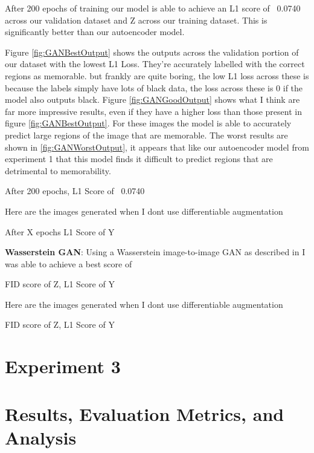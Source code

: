 \documentclass{UoYCSproject}
\begin{document}

After 200 epochs of training our model is able to achieve an L1 score of ~0.0740 across our validation dataset and Z across our training dataset.
This is significantly better than our autoencoder model. 

Figure \ref{fig:GANBestOutput} shows the outputs across the validation portion of our dataset with the lowest L1 Loss. They're accurately labelled with the correct regions as memorable. 
but frankly are quite boring, the low L1 loss across these is because the labels simply have lots of black data, the loss across these is 0 if the model also outputs black. 
Figure \ref{fig:GANGoodOutput} shows what I think are far more impressive results, even if they have a higher loss than those present in figure \ref{fig:GANBestOutput}. For these images the model is able to accurately predict large regions of the image that are memorable.
The worst results are shown in \ref{fig:GANWorstOutput}, it appears that like our autoencoder model from experiment 1 that this model finds it difficult to predict regions that are detrimental to memorability. 

After 200 epochs, L1 Score of ~0.0740

Here are the images generated when I dont use differentiable augmentation

After X epochs L1 Score of Y

\textbf{Wasserstein GAN}: Using a Wasserstein image-to-image GAN as described in \cite{pix2pixwasserstein} I was able to achieve a best score of

FID score of Z, L1 Score of Y

Here are the images generated when I dont use differentiable augmentation

FID score of Z, L1 Score of Y

\section{Experiment 3}



\section{Results, Evaluation Metrics, and Analysis}
\end{document}
